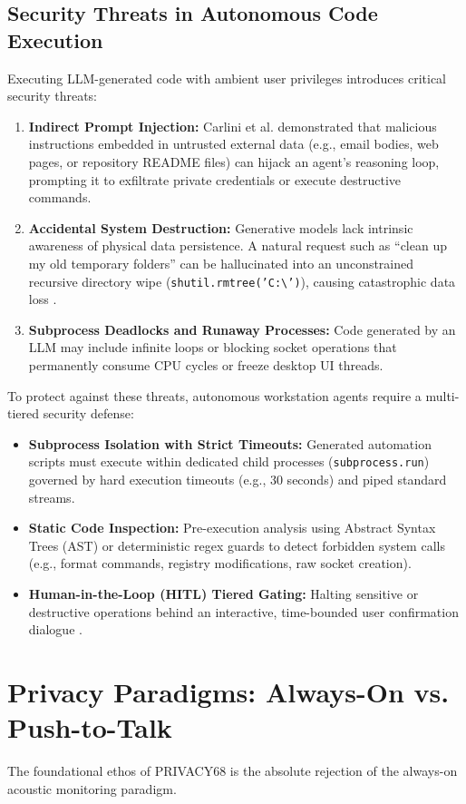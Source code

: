 \subsection{Security Threats in Autonomous Code Execution}
Executing LLM-generated code with ambient user privileges introduces critical security threats:
\begin{enumerate}
    \item \textbf{Indirect Prompt Injection:} Carlini et al. \cite{carlini2024prompt} demonstrated that malicious instructions embedded in untrusted external data (e.g., email bodies, web pages, or repository README files) can hijack an agent's reasoning loop, prompting it to exfiltrate private credentials or execute destructive commands.
    \item \textbf{Accidental System Destruction:} Generative models lack intrinsic awareness of physical data persistence. A natural request such as ``clean up my old temporary folders'' can be hallucinated into an unconstrained recursive directory wipe (\texttt{shutil.rmtree('C:\textbackslash')}), causing catastrophic data loss \cite{shieh2020security}.
    \item \textbf{Subprocess Deadlocks and Runaway Processes:} Code generated by an LLM may include infinite loops or blocking socket operations that permanently consume CPU cycles or freeze desktop UI threads.
\end{enumerate}

To protect against these threats, autonomous workstation agents require a multi-tiered security defense:
\begin{itemize}
    \item \textbf{Subprocess Isolation with Strict Timeouts:} Generated automation scripts must execute within dedicated child processes (\texttt{subprocess.run}) governed by hard execution timeouts (e.g., 30 seconds) and piped standard streams.
    \item \textbf{Static Code Inspection:} Pre-execution analysis using Abstract Syntax Trees (AST) or deterministic regex guards to detect forbidden system calls (e.g., format commands, registry modifications, raw socket creation).
    \item \textbf{Human-in-the-Loop (HITL) Tiered Gating:} Halting sensitive or destructive operations behind an interactive, time-bounded user confirmation dialogue \cite{malkin2022privacy}.
\end{itemize}

\section{Privacy Paradigms: Always-On vs. Push-to-Talk}
The foundational ethos of PRIVACY68 is the absolute rejection of the always-on acoustic monitoring paradigm.

